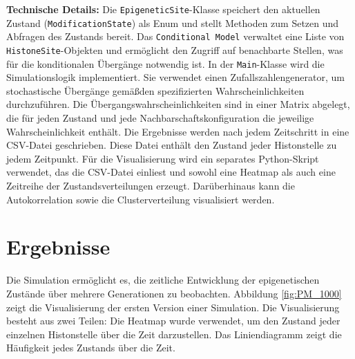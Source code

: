 \documentclass{SeminarV2}
\begin{document}
\textbf{Technische Details:}
Die \texttt{EpigeneticSite}-Klasse speichert den aktuellen Zustand (\texttt{ModificationState}) als Enum und stellt Methoden zum Setzen und Abfragen des Zustands bereit.
Das \texttt{Conditional Model} verwaltet eine Liste von \texttt{HistoneSite}-Objekten und erm\"{o}glicht den Zugriff auf benachbarte Stellen, was f\"{u}r die konditionalen \"{U}berg\"{a}nge notwendig ist.
In der \texttt{Main}-Klasse wird die Simulationslogik implementiert. Sie verwendet einen Zufallszahlengenerator, um stochastische \"{U}berg\"{a}nge gem\"{a}\ss den spezifizierten Wahrscheinlichkeiten durchzuf\"{u}hren. Die \"{U}bergangswahrscheinlichkeiten sind in einer Matrix abgelegt, die f\"{u}r jeden Zustand und jede Nachbarschaftskonfiguration die jeweilige Wahrscheinlichkeit enth\"{a}lt.
Die Ergebnisse werden nach jedem Zeitschritt in eine CSV-Datei geschrieben. Diese Datei enth\"{a}lt den Zustand jeder Histonstelle zu jedem Zeitpunkt.
F\"{u}r die Visualisierung wird ein separates Python-Skript verwendet, das die CSV-Datei einliest und sowohl eine Heatmap als auch eine Zeitreihe der Zustandsverteilungen erzeugt.
Darüberhinaus kann die Autokorrelation sowie die Clusterverteilung visualisiert werden.

\section{Ergebnisse}
Die Simulation erm\"{o}glicht es, die zeitliche Entwicklung der epigenetischen Zust\"{a}nde 
\"{u}ber mehrere Generationen zu beobachten. Abbildung \ref{fig:PM_1000} zeigt die Visualisierung der ersten Version einer Simulation.
Die Visualisierung besteht aus zwei Teilen: Die Heatmap wurde verwendet, um den Zustand jeder einzelnen Histonstelle \"{u}ber die Zeit darzustellen.
Das Liniendiagramm zeigt die H\"{a}ufigkeit jedes Zustands \"{u}ber die Zeit.
\end{document}
